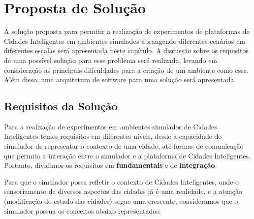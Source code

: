 \chapter{Proposta de Solução}
\label{cap:proposta}

A solução proposta para permitir a realização de experimentos de plataformas de Cidades Inteligentes em ambientes simulados abrangendo diferentes cenários em diferentes escalas será
apresentada neste capítulo.
A discussão sobre os requisitos de uma possível solução para esse problema será realizada, levando em consideração as principais dificuldades para a criação de um ambiente como esse.
Além disso, uma arquitetura de software para uma solução será apresentada. 

\section{Requisitos da Solução}
\label{sec:requisitos}

Para a realização de experimentos em ambientes simulados de Cidades Inteligentes temos requisitos em diferentes níveis, desde a capacidade do simulador de representar o contexto
de uma cidade, até formas de comunicação que permita a interação entre o simulador e a plataforma de Cidades Inteligentes.
Portanto, dividimos os requisitos em \textbf{fundamentais} e de \textbf{integração}.

Para que o simulador possa refletir o contexto de Cidades Inteligentes, onde o sensoriamento de diversos aspectos das cidades já é uma realidade, e a atuação (modificação do estado
das cidades) segue uma crescente, consideramos que o simulador possua os conceitos abaixo representados:


